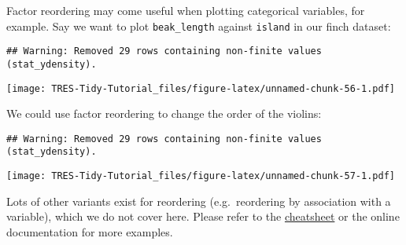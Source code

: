 \documentclass[
]{book}
\newenvironment{Shaded}{}{}
\newcommand{\DataTypeTok}[1]{\textcolor[rgb]{0.56,0.13,0.00}{#1}}
\newcommand{\KeywordTok}[1]{\textcolor[rgb]{0.00,0.44,0.13}{\textbf{#1}}}
\newcommand{\NormalTok}[1]{#1}
\newcommand{\OperatorTok}[1]{\textcolor[rgb]{0.40,0.40,0.40}{#1}}
\newcommand{\StringTok}[1]{\textcolor[rgb]{0.25,0.44,0.63}{#1}}
\begin{document}
Factor reordering may come useful when plotting categorical variables, for example. Say we want to plot \texttt{beak\_length} against \texttt{island} in our finch dataset:

\begin{Shaded}
\end{Shaded}

\begin{verbatim}
## Warning: Removed 29 rows containing non-finite values (stat_ydensity).
\end{verbatim}

\texttt{[image: TRES-Tidy-Tutorial\_files/figure-latex/unnamed-chunk-56-1.pdf]}

We could use factor reordering to change the order of the violins:

\begin{Shaded}
\end{Shaded}

\begin{verbatim}
## Warning: Removed 29 rows containing non-finite values (stat_ydensity).
\end{verbatim}

\texttt{[image: TRES-Tidy-Tutorial\_files/figure-latex/unnamed-chunk-57-1.pdf]}

Lots of other variants exist for reordering (e.g.~reordering by association with a variable), which we do not cover here. Please refer to the \href{https://rstudio.com/resources/cheatsheets/}{cheatsheet} or the online documentation for more examples.
\end{document}

